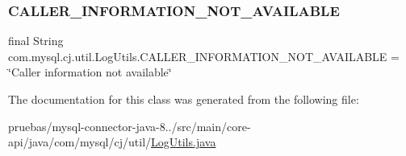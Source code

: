 \subsubsection{\texorpdfstring{C\+A\+L\+L\+E\+R\+\_\+\+I\+N\+F\+O\+R\+M\+A\+T\+I\+O\+N\+\_\+\+N\+O\+T\+\_\+\+A\+V\+A\+I\+L\+A\+B\+LE}{CALLER\_INFORMATION\_NOT\_AVAILABLE}}
{\footnotesize\ttfamily final String com.\+mysql.\+cj.\+util.\+Log\+Utils.\+C\+A\+L\+L\+E\+R\+\_\+\+I\+N\+F\+O\+R\+M\+A\+T\+I\+O\+N\+\_\+\+N\+O\+T\+\_\+\+A\+V\+A\+I\+L\+A\+B\+LE = \char`\"{}Caller information not available\char`\"{}\hspace{0.3cm}{\ttfamily [static]}}



The documentation for this class was generated from the following file\+:\begin{DoxyCompactItemize}
\item 
pruebas/mysql-\/connector-\/java-\/8../src/main/core-\/api/java/com/mysql/cj/util/\mbox{\hyperlink{_log_utils_8java}{Log\+Utils.\+java}}\end{DoxyCompactItemize}
